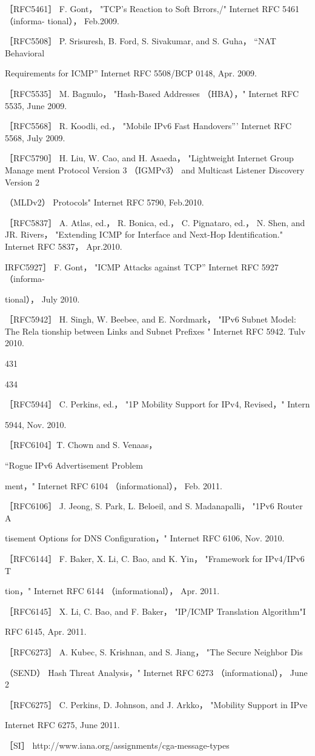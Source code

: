 ［RFC5461］ F. Gont， "TCP's Reaction to Soft Brrors,/" Internet RFC 5461 （informa-
tional）， Feb.2009.

［RFC5508］ P. Srisuresh, B. Ford, S. Sivakumar, and S. Guha， “NAT Behavioral

Requirements for ICMP” Internet RFC 5508/BCP 0148, Apr. 2009.

［RFC5535］ M. Bagnulo， "Hash-Based Addresses （HBA），" Internet RFC 5535, June
2009.

［RFC5568］ R. Koodli, ed.， "Mobile IPv6 Fast Handovers”' Internet RFC 5568, July
2009.

［RFC5790］ H. Liu, W. Cao, and H. Asaeda， "Lightweight Internet Group Manage
ment Protocol Version 3 （IGMPv3） and Multicast Listener Discovery Version 2

（MLDv2） Protocols" Internet RFC 5790, Feb.2010.

［RFC5837］ A. Atlas, ed.， R. Bonica, ed.， C. Pignataro, ed.， N. Shen, and JR. Rivers，
"Extending ICMP for Interface and Next-Hop Identification." Internet RFC 5837，
Apr.2010.

IRFC5927］ F. Gont， "ICMP Attacks against TCP” Internet RFC 5927 （informa-

tional）， July 2010.

［RFC5942］ H. Singh, W. Beebee, and E. Nordmark， "IPv6 Subnet Model: The Rela
tionship between Links and Subnet Prefixes " Internet RFC 5942. Tulv 2010.

431

434

［RFC5944］ C. Perkins, ed.， "1P Mobility Support for IPv4, Revised，" Intern

5944, Nov. 2010.

［RFC6104］T. Chown and S. Venaas，

“Rogue IPv6 Advertisement Problem

ment，" Internet RFC 6104 （informational）， Feb. 2011.

［RFC6106］ J. Jeong, S. Park, L. Beloeil, and S. Madanapalli， "1Pv6 Router A

tisement Options for DNS Configuration，" Internet RFC 6106, Nov. 2010.

［RFC6144］ F. Baker, X. Li, C. Bao, and K. Yin， "Framework for IPv4/IPv6 T

tion，" Internet RFC 6144 （informational）， Apr. 2011.

［RFC6145］ X. Li, C. Bao, and F. Baker， "IP/ICMP Translation Algorithm"I

RFC 6145, Apr. 2011.

［RFC6273］ A. Kubec, S. Krishnan, and S. Jiang， "The Secure Neighbor Dis

（SEND） Hash Threat Analysis，" Internet RFC 6273 （informational）， June 2

［RFC6275］ C. Perkins, D. Johnson, and J. Arkko， "Mobility Support in IPve

Internet RFC 6275, June 2011.

［SI］ http://www.iana.org/assignments/cga-message-types


